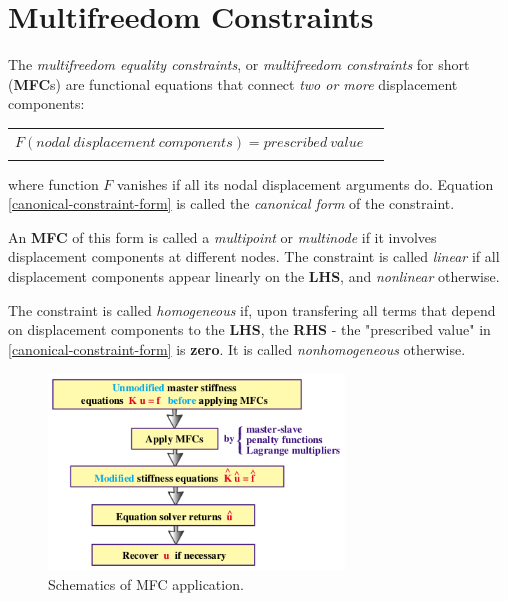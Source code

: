 \documentclass[10pt,b5paper,titlepage]{book}
\newenvironment{bbox}[1][0.96]
{
    \begin{center}
        \begin{tabular}{|p{#1\textwidth}|}
            \hline\\
}
{
            \\\\\hline
        \end{tabular}
    \end{center}
}
\begin{document}
\newpage
\chapter{Multifreedom Constraints}

The \textit{multifreedom equality constraints}, or \textit{multifreedom constraints}
for short (\textbf{MFC}s) are functional equations that connect
\textit{two or more} displacement components:

\begin{bbox}
    \begin{equation}\label{canonical-constraint-form}
        F(nodal\ displacement\ components) = prescribed\ value \quad
    \end{equation}
\end{bbox}

where function $ F $ vanishes if all its nodal displacement arguments do.
Equation \eqref{canonical-constraint-form} is called the
\textit{canonical form} of the constraint.

An \textbf{MFC} of this form is called a \textit{multipoint} or \textit{multinode}
if it involves displacement components at different nodes. The constraint is
called \textit{linear} if all displacement components appear linearly on the
\textbf{LHS}, and \textit{nonlinear} otherwise.

The constraint is called \textit{homogeneous} if, upon transfering all terms
that depend on displacement components to the \textbf{LHS}, the \textbf{RHS} -
the "prescribed value" in \eqref{canonical-constraint-form} is \textbf{zero}.
It is called \textit{nonhomogeneous} otherwise.


\begin{figure}[ht]
    \centering
    \includegraphics[width=0.70\textwidth]{img/mfc_schematic.png}
    \caption{Schematics of MFC application.}
    \label{fig:MFC-schematic}
\end{figure}
\end{document}
